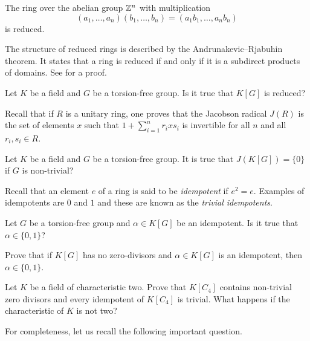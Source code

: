 \begin{example}
    The ring over the abelian group $\mathbb{Z}^n$ with multiplication  \[
    (a_1,\dots,a_n)(b_1,\dots,b_n)=(a_1b_1,\dots,a_nb_n)\]
    is reduced. 
\end{example}

The structure of 
reduced rings is described by the 
Andrunakevic--Rjabuhin theorem. It states
that a ring is reduced if and only if
it is a subdirect products of domains. See
\cite[3.20.5]{MR2015465} for a proof. 

\begin{question}
	\label{question:reduced}
	Let $K$ be a field and $G$ be a torsion-free group. Is it true that 
	$K[G]$ is reduced? 
\end{question}

Recall that if $R$ is a unitary ring, one proves that 
the Jacobson radical $J(R)$ is 
the set of elements $x$ such that
$1+\sum_{i=1}^n r_ixs_i$ is invertible 
for all $n$ and all $r_i,s_i\in R$.

\begin{question}
	\label{question:J}
	Let $K$ be a field and $G$ be a torsion-free group. It is true that 
	$J(K[G])=\{0\}$ if $G$ is non-trivial?
\end{question}

Recall that an element $e$ of a ring is said to be \emph{idempotent} 
if $e^2=e$. Examples of idempotents are $0$ and $1$ and 
these are known as the \emph{trivial idempotents}. 

\begin{question}
	\label{question:idempotente}
	Let $G$ be a torsion-free group and $\alpha\in K[G]$ be an idempotent. 
	Is it true that $\alpha\in\{0,1\}$?
\end{question}

\begin{exercise}
	Prove that if $K[G]$ has no zero-divisors and $\alpha\in K[G]$ is an
	idempotent, then $\alpha\in\{0,1\}$.
\end{exercise}

\begin{exercise}
    Let $K$ be a field of characteristic two. 
	Prove that $K[C_4]$ contains non-trivial zero divisors and every
	idempotent of $K[C_4]$ is trivial. What happens if the characteristic of $K$ is not two?
\end{exercise}

For completeness, let us 
recall the following important question. 

